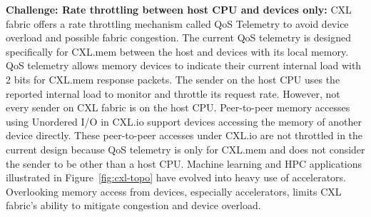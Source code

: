 %
%
\noindent \textbf{Challenge: Rate throttling between host CPU and devices only:}
CXL fabric offers a rate throttling mechanism called QoS Telemetry to avoid device overload and possible fabric congestion. 
%
The current QoS telemetry is designed specifically for CXL.mem between the host and devices with its local memory.
%
QoS telemetry allows memory devices to indicate their current internal load with 2 bits for CXL.mem response packets.  
%
The sender on the host CPU uses the reported internal load to monitor and throttle its request rate. 
%
However, not every sender on CXL fabric is on the host CPU. 
%
Peer-to-peer memory accesses using Unordered I/O in CXL.io support devices accessing the memory of another device directly. 
%
These peer-to-peer accesses under CXL.io are not throttled in the current design because QoS telemetry is only for CXL.mem and does not consider the sender to be other than a host CPU.
%
Machine learning and HPC applications illustrated in Figure~\ref{fig:cxl-topo} have evolved into heavy use of accelerators. 
Overlooking memory access from devices, especially accelerators, limits CXL fabric's ability to mitigate congestion and device overload.


%
%


%
%


